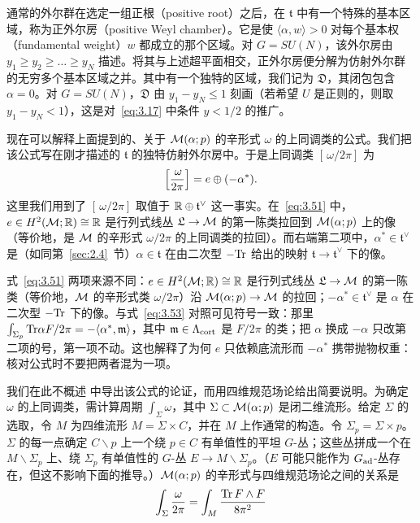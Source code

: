 通常的外尔群在选定一组正根（positive root）之后，在 $\mathfrak t$ 中有一个特殊的基本区域，称为正外尔房（positive Weyl chamber）。它是使 $\langle \alpha,w\rangle >0$ 对每个基本权（fundamental weight）$w$ 都成立的那个区域。对 $G=SU(N)$，该外尔房由 $y_1\geq y_2\geq\dots \geq y_N$ 描述。将其与上述超平面相交，正外尔房便分解为仿射外尔群的无穷多个基本区域之并。其中有一个独特的区域，我们记为 $\mathfrak{D}$，其闭包包含 $\alpha=0$。对 $G=SU(N)$，$\mathfrak{D}$ 由 $y_1-y_N\leq 1$ 刻画（若希望 $U$ 是正则的，则取 $y_1-y_N<1$），这是对~\eqref{eq:3.17} 中条件 $y<1/2$ 的推广。

现在可以解释上面提到的、关于 ${\mathcal{M}}(\alpha;p)$ 的辛形式 $\omega$ 的上同调类的公式。我们把该公式写在刚才描述的 $\mathfrak t$ 的独特仿射外尔房中。于是上同调类 $[\,\omega/2\pi]$ 为
\setcounter{equation}{50}
\begin{equation}\label{eq:3.51}
  \left[\,\omega\over 2\pi\right]=e\oplus
(- \alpha^*).
\end{equation}
这里我们用到了 $[\,\omega/2\pi]$ 取值于 ${\mathbb{R}}\oplus \mathfrak t^\vee$ 这一事实。在~\eqref{eq:3.51} 中，$e\in H^2({\mathcal{M}};{\mathbb{R}})\cong{\mathbb{R}}$ 是行列式线丛 $\mathfrak L\to{\mathcal{M}}$ 的第一陈类拉回到 ${\mathcal{M}}(\alpha;p)$ 上的像（等价地，是 ${\mathcal{M}}$ 的辛形式 $\omega/2\pi$ 的上同调类的拉回）。而右端第二项中，$\alpha^*\in \mathfrak t^\vee$ 是（如同第~\ref{sec:2.4}~节）$\alpha\in \mathfrak t$ 在由二次型 $-{\rm Tr}$ 给出的映射 $\mathfrak t\to \mathfrak t^\vee$ 下的像。

\begin{yizhu}[易错点]式~\eqref{eq:3.51} 两项来源不同：$e\in H^2({\mathcal{M}};{\mathbb{R}})\cong{\mathbb{R}}$ 是行列式线丛 $\mathfrak L\to{\mathcal{M}}$ 的第一陈类（等价地，${\mathcal{M}}$ 的辛形式类 $\omega/2\pi$）沿 ${\mathcal{M}}(\alpha;p)\to{\mathcal{M}}$ 的拉回；$-\alpha^*\in\mathfrak t^\vee$ 是 $\alpha$ 在二次型 $-{\rm Tr}$ 下的像。与式~\eqref{eq:3.53} 对照可见符号一致：那里 $\int_{\Sigma_p}{\rm Tr}\alpha F/2\pi=-\langle\alpha^*,\mathfrak m\rangle$，其中 $\mathfrak m\in\Lambda_{\rm cort}$ 是 $F/2\pi$ 的类；把 $\alpha$ 换成 $-\alpha$ 只改第二项的号，第一项不动。这也解释了为何 $e$ 只依赖底流形而 $-\alpha^*$ 携带抛物权重：核对公式时不要把两者混为一项。\end{yizhu}

我们在此不概述 \cite{ref57,ref58} 中导出该公式的论证，而用四维规范场论给出简要说明。为确定 $\omega$ 的上同调类，需计算周期 $\int_\Sigma\omega$，其中 $\Sigma\subset {\mathcal{M}}(\alpha;p)$ 是闭二维流形。给定 $\Sigma$ 的选取，令 $M$ 为四维流形 $M=\Sigma\times C$，并在 $M$ 上作通常的构造。令 $\Sigma_p=\Sigma \times p$。$\Sigma$ 的每一点确定 $C\backslash p$ 上一个绕 $p\in C$ 有单值性的平坦 $G$-丛；这些丛拼成一个在 $M\backslash \Sigma_p$ 上、绕 $\Sigma_p$ 有单值性的 $G$-丛 $E\to
M\backslash \Sigma_p$。（$E$ 可能只能作为 $G_{\rm ad}$-丛存在，但这不影响下面的推导。）${\mathcal{M}}(\alpha;p)$ 的辛形式与四维规范场论之间的关系是
\setcounter{equation}{51}
\begin{equation}\label{eq:3.52}
  \int_\Sigma{\omega\over 2\pi}=\int_{M}{{\rm Tr}\,F\wedge F\over 8\pi^2}
\end{equation}

